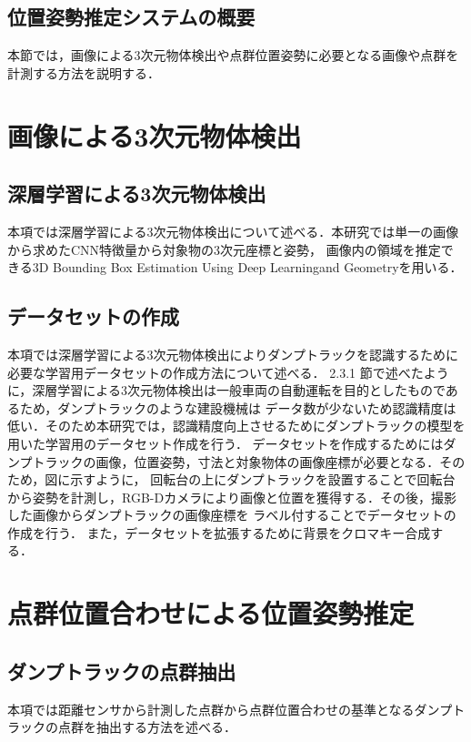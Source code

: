 \subsection{位置姿勢推定システムの概要}
本節では，画像による3次元物体検出や点群位置姿勢に必要となる画像や点群を計測する方法を説明する．

\newpage
\section{画像による3次元物体検出}
\subsection{深層学習による3次元物体検出}
本項では深層学習による3次元物体検出について述べる．本研究では単一の画像から求めたCNN特徴量から対象物の3次元座標と姿勢，
画像内の領域を推定できる3D Bounding Box Estimation Using Deep Learningand Geometry\cite{2017}を用いる．

\newpage

\subsection{データセットの作成}
本項では深層学習による3次元物体検出によりダンプトラックを認識するために必要な学習用データセットの作成方法について述べる．
2.3.1 節で述べたように，深層学習による3次元物体検出は一般車両の自動運転を目的としたものであるため，ダンプトラックのような建設機械は
データ数が少ないため認識精度は低い．そのため本研究では，認識精度向上させるためにダンプトラックの模型を用いた学習用のデータセット作成を行う．
データセットを作成するためにはダンプトラックの画像，位置姿勢，寸法と対象物体の画像座標が必要となる．そのため，図に示すように，
回転台の上にダンプトラックを設置することで回転台から姿勢を計測し，RGB-Dカメラにより画像と位置を獲得する．その後，撮影した画像からダンプトラックの画像座標を
ラベル付することでデータセットの作成を行う．
また，データセットを拡張するために背景をクロマキー合成する．

\newpage

\section{点群位置合わせによる位置姿勢推定}
\subsection{ダンプトラックの点群抽出}
本項では距離センサから計測した点群から点群位置合わせの基準となるダンプトラックの点群を抽出する方法を述べる．

